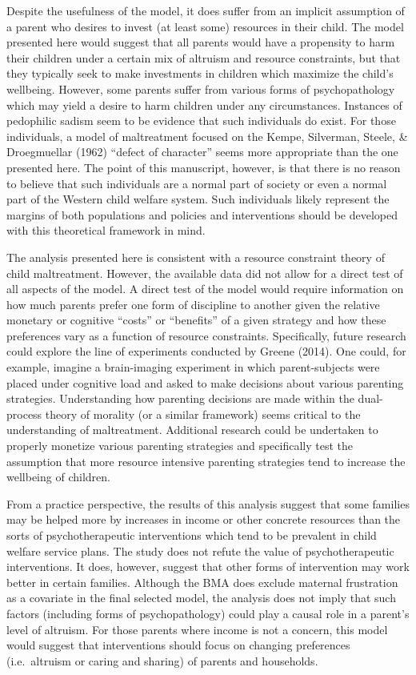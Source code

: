 \documentclass[review]{elsarticle}\usepackage[]{graphicx}\usepackage[]{color}
\begin{document}
Despite the usefulness of the model, it does suffer from an implicit
assumption of a parent who desires to invest (at least some) resources
in their child. The model presented here would suggest that all parents
would have a propensity to harm their children under a certain mix of
altruism and resource constraints, but that they typically seek to make
investments in children which maximize the child's wellbeing. However,
some parents suffer from various forms of psychopathology which may
yield a desire to harm children under any circumstances. Instances of
pedophilic sadism seem to be evidence that such individuals do exist.
For those individuals, a model of maltreatment focused on the Kempe,
Silverman, Steele, \& Droegmuellar (1962) ``defect of character'' seems
more appropriate than the one presented here. The point of this
manuscript, however, is that there is no reason to believe that such
individuals are a normal part of society or even a normal part of the
Western child welfare system. Such individuals likely represent the
margins of both populations and policies and interventions should be
developed with this theoretical framework in mind.

The analysis presented here is consistent with a resource constraint
theory of child maltreatment. However, the available data did not allow
for a direct test of all aspects of the model. A direct test of the
model would require information on how much parents prefer one form of
discipline to another given the relative monetary or cognitive ``costs''
or ``benefits'' of a given strategy and how these preferences vary as a
function of resource constraints. Specifically, future research could
explore the line of experiments conducted by Greene (2014). One
could, for example, imagine a brain-imaging experiment in which
parent-subjects were placed under cognitive load and asked to make
decisions about various parenting strategies. Understanding how
parenting decisions are made within the dual-process theory of morality
(or a similar framework) seems critical to the understanding of
maltreatment. Additional research could be undertaken to properly
monetize various parenting strategies and specifically test the
assumption that more resource intensive parenting strategies tend to
increase the wellbeing of children.

From a practice perspective, the results of this analysis suggest that
some families may be helped more by increases in income or other
concrete resources than the sorts of psychotherapeutic interventions
which tend to be prevalent in child welfare service plans. The study
does not refute the value of psychotherapeutic interventions. It does,
however, suggest that other forms of intervention may work better in
certain families. Although the BMA does exclude maternal frustration as
a covariate in the final selected model, the analysis does not imply
that such factors (including forms of psychopathology) could play a
causal role in a parent's level of altruism. For those parents where
income is not a concern, this model would suggest that interventions
should focus on changing preferences (i.e.~altruism or caring and
sharing) of parents and households.
\end{document}
